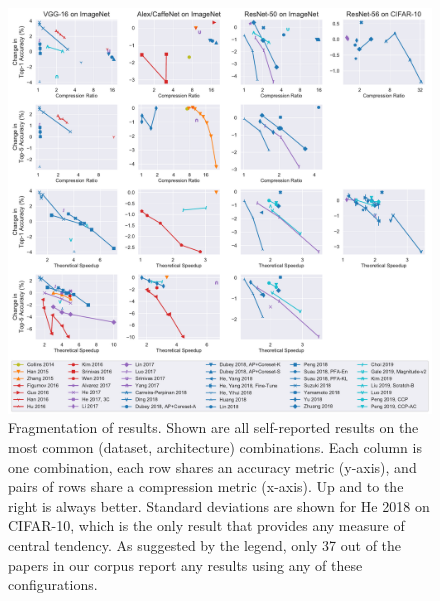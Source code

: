 \begin{figure}[hbt!]
\begin{center}
\includegraphics[width=\linewidth]{all_pruning_curves}
\caption{Fragmentation of results. Shown are all self-reported results on the most common (dataset, architecture) combinations. Each column is one combination, each row shares an accuracy metric (y-axis), and pairs of rows share a compression metric (x-axis). Up and to the right is always better. Standard deviations are shown for He 2018 on CIFAR-10, which is the only result that provides any measure of central tendency.
As suggested by the legend, only 37 out of the \npapers papers in our corpus report any results using any of these configurations.}
\label{fig:prune_grid}
\end{center}
\vspace{-4mm}
\end{figure}

